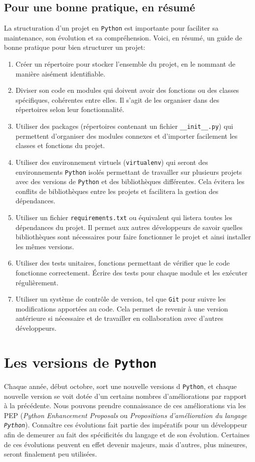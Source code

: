 \documentclass[a4paper,11pt]{book}
\begin{document}
\section{Pour une bonne pratique, en résumé}
La structuration d'un projet en \texttt{Python} est importante pour faciliter sa maintenance, son évolution et sa compréhension. Voici, en résumé, un guide de bonne pratique pour bien structurer un projet:
\begin{enumerate}
	\item Créer un répertoire pour stocker l'ensemble du projet, en le nommant de manière aisément identifiable.
	\item Diviser son code en modules qui doivent avoir des fonctions ou des classes spécifiques, cohérentes entre elles. Il s'agit de les organiser dans des répertoires selon leur fonctionnalité.
	\item Utiliser des packages (répertoires contenant un fichier \texttt{\_\_init\_\_.py}) qui permettent d'organiser des modules connexes et d'importer facilement les classes et fonctions du projet.
	\item Utiliser des environnement virtuels (\texttt{virtualenv}) qui seront des environnements \texttt{Python} isolés permettant de travailler sur plusieurs projets avec des versions de \texttt{Python} et des bibliothèques différentes. Cela évitera les conflits de bibliothèques entre les projets et facilitera la gestion des dépendances.
	\item Utiliser un fichier \texttt{requirements.txt} ou équivalent qui listera toutes les dépendances du projet. Il permet aux autres développeurs de savoir quelles bibliothèques sont nécessaires pour faire fonctionner le projet et ainsi installer les mêmes versions.
	\item Utiliser des tests unitaires, fonctions permettant de vérifier que le code fonctionne correctement. Écrire des tests pour chaque module et les exécuter régulièrement.
	\item Utiliser un système de contrôle de version, tel que \texttt{Git} pour suivre les modifications apportées au code. Cela permet de revenir à une version antérieure si nécessaire et de travailler en collaboration avec d'autres développeurs.
\end{enumerate}
\medskip

\chapter{Les versions de \texttt{Python}}
Chaque année, début octobre, sort une nouvelle versions d \texttt{Python}, et chaque nouvelle version se voit dotée d'un certains nombres d'améliorations par rapport à la précédente. Nous pouvons prendre connaissance de ces améliorations via les PEP (\textit{Python Enhancement Proposals} ou \textit{Propositions d'amélioration du langage \texttt{Python}}). Connaître ces évolutions fait partie des impératifs pour un développeur afin de demeurer au fait des spécificités du langage et de son évolution. Certaines de ces évolutions peuvent en effet devenir majeurs, mais d'autres, plus mineures, seront finalement peu utilisées.
\medskip
\end{document}
